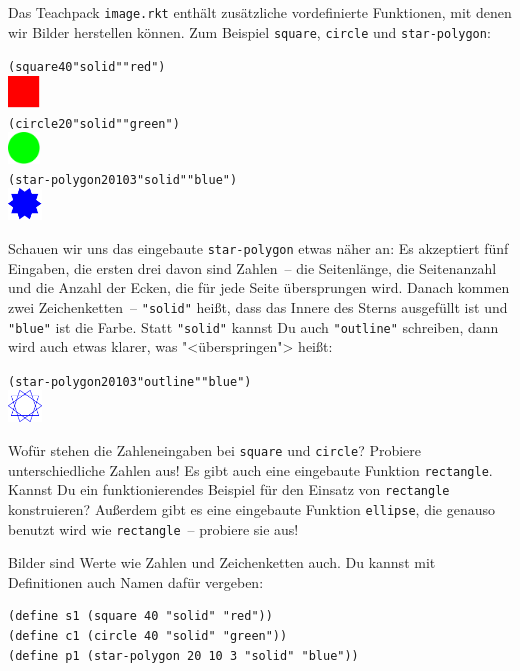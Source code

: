 Das Teachpack \texttt{image.rkt} enthält zusätzliche vordefinierte
Funktionen, mit denen wir Bilder herstellen können.  Zum Beispiel
\texttt{square}, \texttt{circle} und \texttt{star-polygon}:
%
\begin{alltt}
(square 40 "solid" "red")
\evalsto{} \includegraphics[height=24pt]{i1prog/square}
(circle 20 "solid" "green")
\evalsto{} \includegraphics[height=24pt]{i1prog/circle}
(star-polygon 20 10 3 "solid" "blue")
\evalsto{} \includegraphics[height=24pt]{i1prog/starpolygon}
\end{alltt}
%
Schauen wir uns das eingebaute \texttt{star-polygon} etwas näher an:
Es akzeptiert fünf Eingaben, die ersten drei davon sind Zahlen~-- die
Seitenlänge, die Seitenanzahl und die Anzahl der Ecken, die für jede
Seite übersprungen wird.  Danach kommen zwei Zeichenketten~--
\verb|"solid"| heißt, dass das Innere des Sterns ausgefüllt ist und
\verb|"blue"| ist die Farbe.  Statt \verb|"solid"| kannst Du auch
\verb|"outline"| schreiben, dann wird auch etwas klarer, was
"<überspringen"> heißt:
%
\begin{alltt}
(star-polygon 20 10 3 "outline" "blue")
\evalsto{} \includegraphics[height=24pt]{i1prog/starpolygon_outline}
\end{alltt}
%
\begin{aufgabeinline}
  Wofür stehen die Zahleneingaben bei \texttt{square} und
  \texttt{circle}?  Probiere unterschiedliche Zahlen aus!  Es gibt
  auch eine eingebaute Funktion \texttt{rectangle}.  Kannst Du ein
  funktionierendes Beispiel für den Einsatz von \texttt{rectangle}
  konstruieren?  Außerdem gibt es eine eingebaute Funktion
  \texttt{ellipse}, die genauso benutzt wird wie \texttt{rectangle}~--
  probiere sie aus!
\end{aufgabeinline}
%
Bilder sind Werte wie Zahlen und Zeichenketten auch.  Du kannst
mit Definitionen auch Namen dafür vergeben:
%
\begin{verbatim}
(define s1 (square 40 "solid" "red"))
(define c1 (circle 40 "solid" "green"))
(define p1 (star-polygon 20 10 3 "solid" "blue"))
\end{verbatim}
